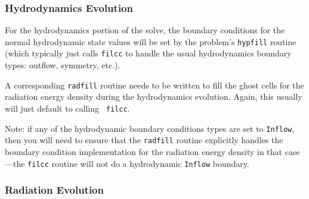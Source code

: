\documentclass[11pt,letterpaper]{article}
\begin{document}
\subsubsection{Hydrodynamics Evolution}

For the hydrodynamics portion of the solve, the boundary conditions
for the normal hydrodynamic state values will be set by the problem's
{\tt hypfill} routine (which typically just calls {\tt filcc} to handle
the usual hydrodynamics boundary types: outflow, symmetry, etc.).

A corresponding {\tt radfill} routine needs to be written to fill the
ghost cells for the radiation energy density during the hydrodynamics
evolution.  Again, this usually will just default to calling {\tt
  filcc}.

Note: if any of the hydrodynamic boundary conditions types are set
to {\tt Inflow}, then you will need to ensure that the {\tt radfill}
routine explicitly handles the boundary condition implementation
for the radiation energy density in that case---the {\tt filcc}
routine will not do a hydrodynamic {\tt Inflow} boundary.


\subsubsection{Radiation Evolution}
\end{document}

